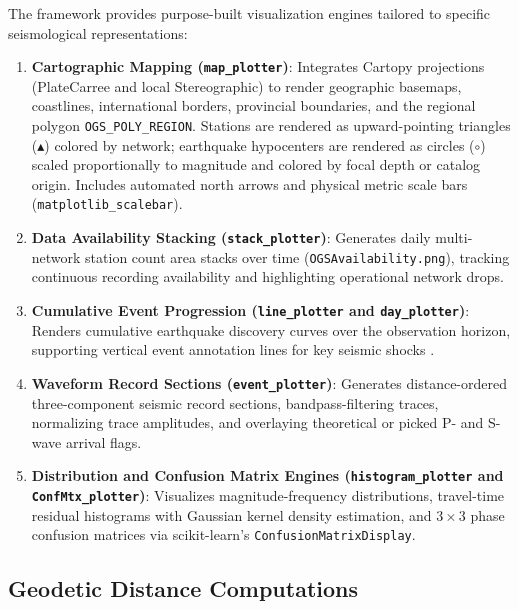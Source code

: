 The framework provides purpose-built visualization engines
tailored to specific seismological representations:
\begin{enumerate}
  \item \textbf{Cartographic Mapping (\texttt{map\_plotter})}:
    Integrates Cartopy \parencite{Cartopy} projections (PlateCarree and local
    Stereographic) to render geographic basemaps, coastlines,
    international borders, provincial boundaries, and the regional
    polygon \texttt{OGS\_POLY\_REGION}. Stations are rendered as
    upward-pointing triangles ($\blacktriangle$) colored by
    network; earthquake hypocenters are rendered as circles
    ($\circ$) scaled proportionally to magnitude and colored by
    focal depth or catalog origin. Includes automated north arrows
    and physical metric scale bars (\texttt{matplotlib\_scalebar}).
  \item \textbf{Data Availability Stacking
    (\texttt{stack\_plotter})}: Generates daily multi-network
    station count area stacks over time
    (\texttt{OGSAvailability.png}), tracking continuous recording
    availability and highlighting operational network drops.
  \item \textbf{Cumulative Event Progression
    (\texttt{line\_plotter} and \texttt{day\_plotter})}: Renders
    cumulative earthquake discovery curves over the observation
    horizon, supporting vertical event annotation lines for key
    seismic shocks .
  \item \textbf{Waveform Record Sections
    (\texttt{event\_plotter})}: Generates distance-ordered
    three-component seismic record sections, bandpass-filtering
    traces, normalizing trace amplitudes, and overlaying
    theoretical or picked P- and S-wave arrival flags.
  \item \textbf{Distribution and Confusion Matrix Engines
    (\texttt{histogram\_plotter} and \texttt{ConfMtx\_plotter})}:
    Visualizes magnitude-frequency distributions, travel-time
    residual histograms with Gaussian kernel density estimation,
    and $3 \times 3$ phase confusion matrices via scikit-learn's
    \parencite{scikit-learn} \texttt{ConfusionMatrixDisplay}.
\end{enumerate}

\subsection{Geodetic Distance Computations}
\label{subsec:geodetic_math}

